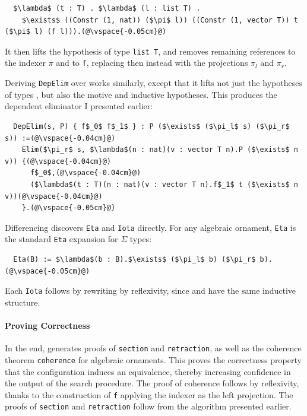 \begin{lstlisting}
  $\lambda$ (t : T) . $\lambda$ (l : list T) .
    $\exists$ ((Constr (1, nat)) ($\pi$ l)) ((Constr (1, vector T)) t ($\pi$ l) (f l))).(@\vspace{-0.05cm}@)
\end{lstlisting}
It then lifts the hypothesis of type \lstinline{list T}, and removes remaining references to the indexer $\pi$ and to \lstinline{f},
replacing then instead with the projections $\pi_l$ and $\pi_r$.

Deriving \lstinline{DepElim} over \B works similarly, except that it lifts not just the hypotheses of types \Aa, but 
also the motive and inductive hypotheses.
This produces the dependent eliminator I presented earlier:

\begin{lstlisting}
  DepElim(s, P) { f$_0$ f$_1$ } : P ($\exists$ ($\pi_l$ s) ($\pi_r$ s)) :=(@\vspace{-0.04cm}@)
    Elim($\pi_r$ s, $\lambda$(n : nat)(v : vector T n).P ($\exists$ n v)) {(@\vspace{-0.04cm}@)
      f$_0$,(@\vspace{-0.04cm}@)
      ($\lambda$(t : T)(n : nat)(v : vector T n).f$_1$ t ($\exists$ n v))(@\vspace{-0.04cm}@)
    }.(@\vspace{-0.05cm}@) 
\end{lstlisting}

Differencing discovers \lstinline{Eta} and \lstinline{Iota} directly.
For any algebraic ornament, \lstinline{Eta} is the standard \lstinline{Eta} expansion for $\Sigma$ types:

\begin{lstlisting}
  Eta(B) := $\lambda$(b : B).$\exists$ ($\pi_l$ b) ($\pi_r$ b).(@\vspace{-0.05cm}@)
\end{lstlisting}
Each \lstinline{Iota} follows by rewriting by reflexivity, since \Aa and \AI have the same inductive structure.

\paragraph{Proving Correctness}
In the end, \toolnamec generates proofs of \lstinline{section} and \lstinline{retraction},
as well as the coherence theorem \lstinline{coherence} for algebraic ornaments.
This proves the correctness property that the configuration induces an equivalence, thereby
increasing confidence in the output of the search procedure.
The proof of coherence follows by reflexivity, thanks to the construction of \lstinline{f} 
applying the indexer as the left projection.
The proofs of \lstinline{section} and \lstinline{retraction} follow from the algorithm presented earlier.

